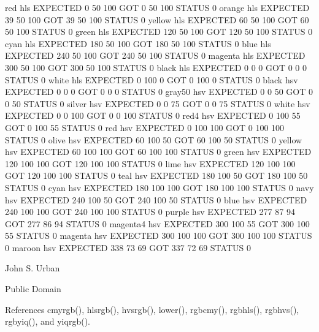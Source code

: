 \begin{DoxyDescription}
\begin{DoxyPre}     red       hls EXPECTED   0  50 100 GOT   0  50 100 STATUS 0
     orange    hls EXPECTED  39  50 100 GOT  39  50 100 STATUS 0
     yellow    hls EXPECTED  60  50 100 GOT  60  50 100 STATUS 0
     green     hls EXPECTED 120  50 100 GOT 120  50 100 STATUS 0
     cyan      hls EXPECTED 180  50 100 GOT 180  50 100 STATUS 0
     blue      hls EXPECTED 240  50 100 GOT 240  50 100 STATUS 0
     magenta   hls EXPECTED 300  50 100 GOT 300  50 100 STATUS 0
     black     hls EXPECTED   0   0   0 GOT   0   0   0 STATUS 0
     white     hls EXPECTED   0 100   0 GOT   0 100   0 STATUS 0
     black     hsv EXPECTED   0   0   0 GOT   0   0   0 STATUS 0
     gray50    hsv EXPECTED   0   0  50 GOT   0   0  50 STATUS 0
     silver    hsv EXPECTED   0   0  75 GOT   0   0  75 STATUS 0
     white     hsv EXPECTED   0   0 100 GOT   0   0 100 STATUS 0
     red4      hsv EXPECTED   0 100  55 GOT   0 100  55 STATUS 0
     red       hsv EXPECTED   0 100 100 GOT   0 100 100 STATUS 0
     olive     hsv EXPECTED  60 100  50 GOT  60 100  50 STATUS 0
     yellow    hsv EXPECTED  60 100 100 GOT  60 100 100 STATUS 0
     green     hsv EXPECTED 120 100 100 GOT 120 100 100 STATUS 0
     lime      hsv EXPECTED 120 100 100 GOT 120 100 100 STATUS 0
     teal      hsv EXPECTED 180 100  50 GOT 180 100  50 STATUS 0
     cyan      hsv EXPECTED 180 100 100 GOT 180 100 100 STATUS 0
     navy      hsv EXPECTED 240 100  50 GOT 240 100  50 STATUS 0
     blue      hsv EXPECTED 240 100 100 GOT 240 100 100 STATUS 0
     purple    hsv EXPECTED 277  87  94 GOT 277  86  94 STATUS 0
     magenta4  hsv EXPECTED 300 100  55 GOT 300 100  55 STATUS 0
     magenta   hsv EXPECTED 300 100 100 GOT 300 100 100 STATUS 0
     maroon    hsv EXPECTED 338  73  69 GOT 337  72  69 STATUS 0
 \end{DoxyPre}
 


\item[A\+U\+T\+H\+OR ]

John S. Urban




\item[L\+I\+C\+E\+N\+SE ]

Public Domain




\end{DoxyDescription}

References cmyrgb(), hlsrgb(), hvsrgb(), lower(), rgbcmy(), rgbhls(), rgbhvs(), rgbyiq(), and yiqrgb().

